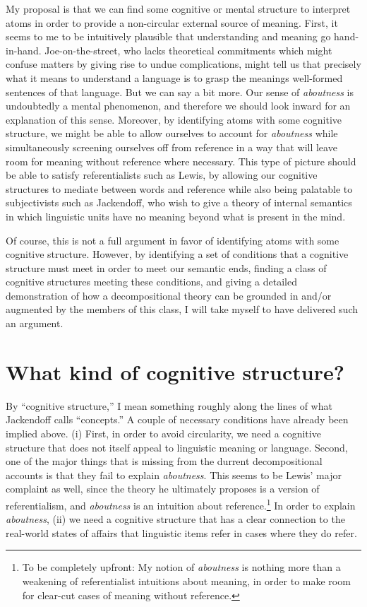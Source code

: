 \documentclass[12pt]{amsart}
\begin{document}
My proposal is that we can find some cognitive or mental structure to interpret atoms in order to provide a non-circular external source of meaning. First, it seems to me to be intuitively plausible that understanding and meaning go hand-in-hand. Joe-on-the-street, who lacks theoretical commitments which might confuse matters by giving rise to undue complications, might tell us that precisely what it means to understand a language is to grasp the meanings well-formed sentences of that language. But we can say a bit more. Our sense of \emph{aboutness} is undoubtedly a mental phenomenon, and therefore we should look inward for an explanation of this sense. Moreover, by identifying atoms with some cognitive structure, we might be able to allow ourselves to account for \emph{aboutness} while simultaneously screening ourselves off from reference in a way that will leave room for meaning without reference where necessary. This type of picture should be able to satisfy referentialists such as Lewis, by allowing our cognitive structures to mediate between words and reference while also being palatable to subjectivists such as Jackendoff, who wish to give a theory of internal semantics in which linguistic units have no meaning beyond what is present in the mind.

Of course, this is not a full argument in favor of identifying atoms with some cognitive structure. However, by identifying a set of conditions that a cognitive structure must meet in order to meet our semantic ends, finding a class of cognitive structures meeting these conditions, and giving a detailed demonstration of how a decompositional theory can be grounded in and/or augmented by the members of this class, I will take myself to have delivered such an argument.

\section{What kind of cognitive structure?}

By ``cognitive structure,'' I mean something roughly along the lines of what Jackendoff calls ``concepts.'' A couple of necessary conditions have already been implied above. (i) First, in order to avoid circularity, we need a cognitive structure that does not itself appeal to linguistic meaning or language. Second, one of the major things that is missing from the durrent decompositional accounts is that they fail to explain \emph{aboutness}. This seems to be Lewis' major complaint as well, since the theory he ultimately proposes is a version of referentialism, and \emph{aboutness} is an intuition about reference.\footnote{To be completely upfront: My notion of \emph{aboutness} is nothing more than a weakening of referentialist intuitions about meaning, in order to make room for clear-cut cases of meaning without reference.} In order to explain \emph{aboutness}, (ii) we need a cognitive structure that has a clear connection to the real-world states of affairs that linguistic items refer in cases where they do refer.
\end{document}
